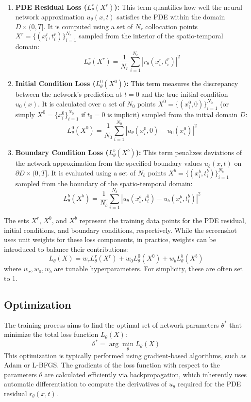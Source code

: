 \documentclass[11pt,twoside,openright]{report}
\begin{document}
\begin{enumerate}
    \item \textbf{PDE Residual Loss ($L^{r}_{\theta}(X^r)$):} This term quantifies how well the neural network approximation $u_{\theta}(x, t)$ satisfies the PDE within the domain $D \times (0, T]$. It is computed using a set of $N_r$ collocation points $X^r = \{(x_i^r, t_i^r)\}_{i=1}^{N_r}$ sampled from the interior of the spatio-temporal domain:
    $$
    L^{r}_{\theta}(X^r) = \frac{1}{N_r} \sum_{i=1}^{N_r} |r_{\theta}(x_i^r, t_i^r)|^2
    $$

    \item \textbf{Initial Condition Loss ($L^{0}_{\theta}(X^0)$):} This term measures the discrepancy between the network's prediction at $t=0$ and the true initial condition $u_0(x)$. It is calculated over a set of $N_0$ points $X^0 = \{(x_i^0, 0)\}_{i=1}^{N_0}$ (or simply $X^0 = \{x_i^0\}_{i=1}^{N_0}$ if $t_0=0$ is implicit) sampled from the initial domain $D$:
    $$
    L^{0}_{\theta}(X^0) = \frac{1}{N_0} \sum_{i=1}^{N_0} |u_{\theta}(x_i^0, 0) - u_0(x_i^0)|^2
    $$

    \item \textbf{Boundary Condition Loss ($L^{b}_{\theta}(X^b)$):} This term penalizes deviations of the network approximation from the specified boundary values $u_b(x, t)$ on $\partial D \times (0, T]$. It is evaluated using a set of $N_b$ points $X^b = \{(x_i^b, t_i^b)\}_{i=1}^{N_b}$ sampled from the boundary of the spatio-temporal domain:
    $$
    L^{b}_{\theta}(X^b) = \frac{1}{N_b} \sum_{i=1}^{N_b} |u_{\theta}(x_i^b, t_i^b) - u_b(x_i^b, t_i^b)|^2
    $$
\end{enumerate}
The sets $X^r$, $X^0$, and $X^b$ represent the training data points for the PDE residual, initial conditions, and boundary conditions, respectively. While the screenshot uses unit weights for these loss components, in practice, weights can be introduced to balance their contributions:
$$
L_{\theta}(X) = w_r L^{r}_{\theta}(X^r) + w_0 L^{0}_{\theta}(X^0) + w_b L^{b}_{\theta}(X^b)
$$
where $w_r, w_0, w_b$ are tunable hyperparameters. For simplicity, these are often set to 1.

\subsection{Optimization}

The training process aims to find the optimal set of network parameters $\theta^*$ that minimize the total loss function $L_{\theta}(X)$:
$$
\theta^* = \arg \min_{\theta} L_{\theta}(X)
$$
This optimization is typically performed using gradient-based algorithms, such as Adam or L-BFGS. The gradients of the loss function with respect to the parameters $\theta$ are calculated efficiently via backpropagation, which inherently uses automatic differentiation to compute the derivatives of $u_{\theta}$ required for the PDE residual $r_{\theta}(x,t)$.
\end{document}
